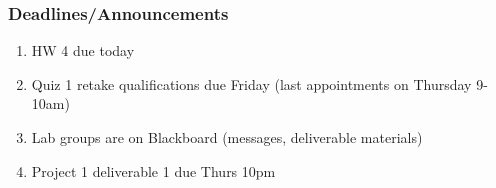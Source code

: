 
\begin{frame}
    \frametitle{Deadlines/Announcements}
\begin{enumerate}
            \item HW 4 due today
            \item Quiz 1 retake qualifications due Friday (last appointments on Thursday 9-10am)
            \item Lab groups are on Blackboard (messages, deliverable materials)
            \item Project 1 deliverable 1 due Thurs 10pm
        \end{enumerate}
\end{frame}
